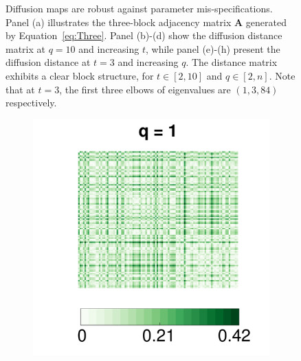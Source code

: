 \documentclass[11pt]{article}
\theoremstyle{definition}
\begin{document}
\begin{figure}[!ht]
\begin{subfigure}[b]{0.23\textwidth}
		\caption{}
		\label{fig:q10}
	\end{subfigure}
	\caption{Diffusion maps are robust against parameter mis-specifications. Panel (a) illustrates the three-block adjacency matrix $\mathbf{A}$ generated by Equation~\ref{eq:Three}. Panel (b)-(d) show the diffusion distance matrix at $q=10$ and increasing $t$, while panel (e)-(h) present the diffusion distance at $t=3$ and increasing $q$. The distance matrix exhibits a clear block structure, for $t \in [2,10]$ and $q \in [2,n]$. Note that at $t=3$, the first three elbows of eigenvalues are $(1,3,84)$ respectively.}
	\label{fig:diffusions}
\end{figure}

\begin{figure}[!ht]
	\centering
	\begin{subfigure}[b]{0.23\textwidth}
	\includegraphics[width=\textwidth]{../Figure/E1.pdf}
	\caption{}
	\label{fig:e1}
	\end{subfigure}
	\begin{subfigure}[b]{0.23\textwidth}

\end{subfigure}
\end{figure}
\end{document}
